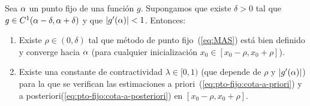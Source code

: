 \begin{theorem}
  \label{thm:punto-fijo-convergencia-local}
  Sea $\alpha$ un punto fijo de una función $g$. Supongamos que existe
  $\delta>0$ tal que $g\in C^1(\alpha-\delta,\alpha+\delta)$ y que
  $|g'(\alpha)|<1$. Entonces:
  \begin{enumerate}
  \item Existe $\rho\in (0,\delta)$ tal que método de punto
    fijo~(\ref{eq:MAS}) está bien definido y converge hacia $\alpha$
    (para cualquier inicialización $x_0 \in [x_0-\rho,x_0+\rho]$).
  \item Existe una constante de contractividad $\lambda\in [0,1)$ (que
    depende de $\rho$ y $|g'(\alpha)|$) para la que se verifican las
    estimaciones a priori~(\ref{eq:pto-fijo:cota-a-priori}) y a
    posteriori(\ref{eq:pto-fijo:cota-a-posteriori}) en
    $[x_0-\rho,x_0+\rho]$.
  \end{enumerate}
\end{theorem}


